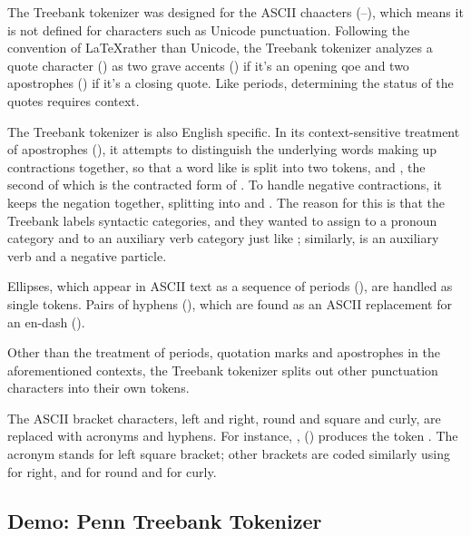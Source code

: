 The Treebank tokenizer was designed for the ASCII chaacters
(--), which means it is not defined for
characters such as Unicode punctuation.  Following the convention of
\LaTeX rather than Unicode, the Treebank tokenizer analyzes a quote
character () as two grave accents () if
it's an opening qoe and two apostrophes () if it's a
closing quote.  Like periods, determining the status of the quotes
requires context.

The Treebank tokenizer is also English specific.  In its
context-sensitive treatment of apostrophes (), it
attempts to distinguish the underlying words making up contractions
together, so that a word like  is split into two
tokens,  and , the second of which
is the contracted form of .  To handle negative
contractions, it keeps the negation together, splitting
 into  and .
The reason for this is that the Treebank labels syntactic categories,
and they wanted to assign  to a pronoun category and
 to an auxiliary verb category just like
; similarly,  is an auxiliary verb
and  a negative particle.

Ellipses, which appear in ASCII text as a sequence of periods
(), are handled as single tokens.  Pairs of hyphens
(\stringmention{{-}{-}}), which are found as an ASCII replacement for
an en-dash (\charmention{{}--{}}).

Other than the treatment of periods, quotation marks and apostrophes
in the aforementioned contexts, the Treebank tokenizer splits out
other punctuation characters into their own tokens.

The ASCII bracket characters, left and right, round and square and curly,
are replaced with acronyms and hyphens.  For instance, ,
 (\charmention{[}) produces the
token .  The acronym 
stands for left square bracket; other brackets are coded similarly
using  for right, and  for round and
 for curly.

\subsection{Demo: Penn Treebank Tokenizer}

